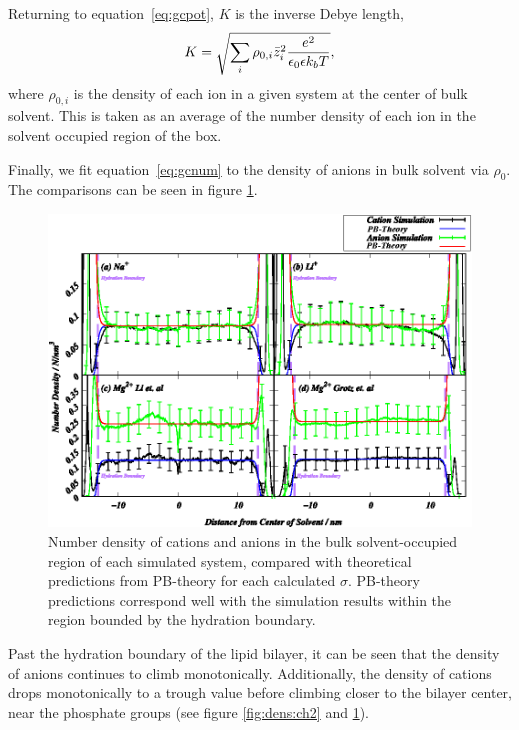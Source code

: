 \documentclass[12pt,openany,final]{book}
\begin{document}
Returning to equation~\ref{eq:gcpot}, $K$ is the inverse Debye length,
\begin{equation}
K=\sqrt{\sum_{i} \rho_{0,i} \bar z_i^2\frac{\text{\si{\elementarycharge}}^2}{\epsilon_0 \epsilon k_bT}},
\label{eq:debyelength}
\end{equation}
where $\rho_{0,i}$ is the density of each ion in a given system at the center of bulk solvent.
This is taken as an average of the number density of each ion in the solvent occupied region of the box.

Finally, we fit equation~\ref{eq:gcnum} to the density of anions in 
bulk solvent via $\rho_0$. The comparisons
can be seen in figure \ref{fig:catgcdens:ch2}.
\begin{figure}
    \caption[Ion number densities]{Number density of cations and anions in the bulk solvent-occupied region of each
    simulated system, compared with theoretical predictions from PB-theory for each calculated $\sigma$. PB-theory predictions
    correspond well with the simulation results within the region bounded by the hydration boundary.}
    \label{fig:catgcdens:ch2}
    \includegraphics[width=\textwidth]{Figure_5_ch2.eps}
\end{figure}
Past the hydration boundary of the lipid bilayer, it can be seen that the density of anions continues 
to climb monotonically. Additionally, the density of cations 
drops monotonically to a trough value before climbing closer to the bilayer center, near the phosphate groups 
(see figure \ref{fig:dens:ch2} and \ref{fig:catgcdens:ch2}). 
\end{document}
